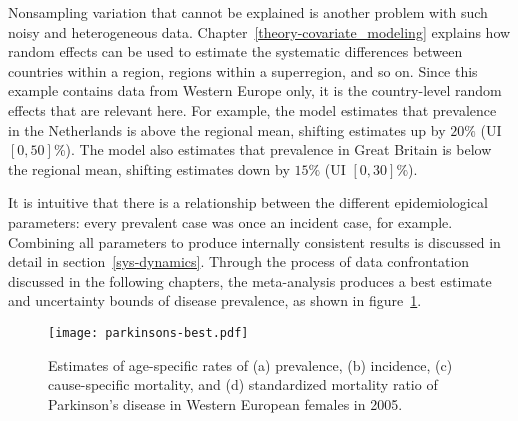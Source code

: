 Nonsampling variation that cannot be explained is another problem with
such noisy and heterogeneous data.  Chapter~\ref{theory-covariate_modeling}
explains how random effects can be used
to estimate the systematic differences between countries within a
region, regions within a superregion, and so on.  Since this example
contains data from Western Europe only, it is the country-level random
effects that are relevant here.  For example, the model estimates that
prevalence in the Netherlands is above the regional mean, shifting
estimates up by $20\%$ (UI $[0, 50]$\%).  The model also estimates
that prevalence in Great Britain is below the regional mean, shifting estimates
down by $15\%$ (UI $[0, 30]\%$).

It is intuitive that there is a relationship between the
different epidemiological parameters: every prevalent case was once an incident
case, for example.  Combining all parameters to produce internally
consistent results is discussed in detail in section~\ref{sys-dynamics}.
Through the process of data confrontation
discussed in the following chapters, the meta-analysis produces a best
estimate and uncertainty bounds of disease prevalence, as shown in
figure~\ref{fig:intro-parkinsons fit}.

    \begin{figure}[h]
        \begin{center}
            \texttt{[image: parkinsons-best.pdf]}
            \caption{Estimates of age-specific rates of
              (a) prevalence, (b) incidence,
              (c) cause-specific mortality, and 
              (d) standardized mortality ratio of Parkinson's
              disease in Western European females in 2005.}
            \label{fig:intro-parkinsons fit}
        \end{center}
    \end{figure}
